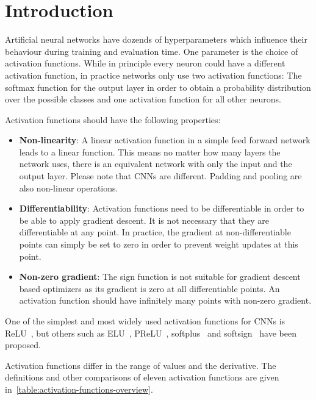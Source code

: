 \section{Introduction}
Artificial neural networks have dozends of hyperparameters which influence
their behaviour during training and evaluation time. One parameter is the
choice of activation functions. While in principle every neuron could have a
different activation function, in practice networks only use two activation
functions: The softmax function for the output layer in order to obtain a
probability distribution over the possible classes and one activation function
for all other neurons.

Activation functions should have the following properties:
\begin{itemize}
    \item \textbf{Non-linearity}: A linear activation function in a simple feed
          forward network leads to a linear function. This means no matter how
          many layers the network uses, there is an equivalent network with
          only the input and the output layer. Please note that \glspl{CNN} are
          different. Padding and pooling are also non-linear operations.
    \item \textbf{Differentiability}: Activation functions need to be
          differentiable in order to be able to apply gradient descent. It is
          not necessary that they are differentiable at any point. In practice,
          the gradient at non-differentiable points can simply be set to zero
          in order to prevent weight updates at this point.
    \item \textbf{Non-zero gradient}: The sign function is not suitable for
          gradient descent based optimizers as its gradient is zero at all
          differentiable points. An activation function should have infinitely
          many points with non-zero gradient.
\end{itemize}

One of the simplest and most widely used activation functions for \glspl{CNN}
is \gls{ReLU}~\cite{AlexNet-2012}, but others such as
\gls{ELU}~\cite{clevert2015fast}, \gls{PReLU}~\cite{he2015delving}, softplus~\cite{7280459}
and softsign~\cite{bergstra2009quadratic} have been proposed.

Activation functions differ in the range of values and the derivative. The
definitions and other comparisons of eleven activation functions are given
in~\cref{table:activation-functions-overview}.


